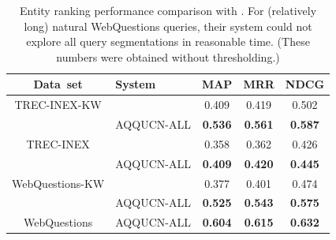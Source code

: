 \documentclass{svjour3}
\begin{document}
\begin{table}[th]
\centering
\begin{tabular}{| c | l | c | c | c |}
\hline
Data~set    & System       & MAP & MRR & NDCG \\
\hline
\rowcolor{red!5} \cellcolor{white}
TREC-INEX-KW & \citet{JoshiSC2014KgCorpusJoint}
& 0.409  & 0.419  &  0.502\\
\rowcolor{green!5} \cellcolor{white}
& AQQUCN-ALL     & \textbf{0.536}  &  \textbf{0.561}  &  \textbf{0.587}\\
\hline
\hline
\rowcolor{red!5} \cellcolor{white}
TREC-INEX & \citet{JoshiSC2014KgCorpusJoint} 
& 0.358 & 0.362 & 0.426 \\
\rowcolor{green!5} \cellcolor{white}
& AQQUCN-ALL  & \textbf{0.409}   & \textbf{0.420}  &  \textbf{0.445} \\
\hline
\hline
\rowcolor{red!5} \cellcolor{white}
WebQuestions-KW     & \citet{JoshiSC2014KgCorpusJoint}
& 0.377  & 0.401  &  0.474\\
\rowcolor{green!5} \cellcolor{white}
& AQQUCN-ALL      & \textbf{0.525}  &  \textbf{0.543}  &  \textbf{0.575}\\
\hline
\hline
\rowcolor{green!5} \cellcolor{white}
WebQuestions  & AQQUCN-ALL &  \textbf{0.604} &  \textbf{0.615} & \textbf{0.632} \\
\hline
\end {tabular}
\caption{Entity ranking performance comparison with \citet{JoshiSC2014KgCorpusJoint}.  For (relatively long) natural WebQuestions queries, their system could not explore all query segmentations in reasonable time.  (These numbers were obtained without thresholding.)}
\label{fig:finalcomparisonMap}
\end{table}
\end{document}
